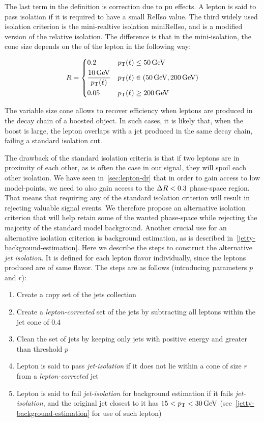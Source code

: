 The last term in the definition is correction due to \gls{pu} effects. A lepton is said to pass isolation if it is required to have a small RelIso value. The third widely used isolation criterion is the mini-realtive isolation miniRelIso, and is a modified version of the relative isolation. The difference is that in the mini-isolation, the cone size depends on the \pt of the lepton in the following way:

\begin{equation}
R = 
\begin{dcases}
0.2 & p_{\mathrm{T}}(\ell)\leq 50\,\text{Ge\hspace{-.08em}V} \\
\frac{10\,\text{Ge\hspace{-.08em}V}}{p_{\mathrm{T}}(\ell)} & p_{\mathrm{T}}(\ell) \in (50\,\text{Ge\hspace{-.08em}V} , 200\,\text{Ge\hspace{-.08em}V}) \\
0.05 & p_{\mathrm{T}}(\ell)\geq 200\,\text{Ge\hspace{-.08em}V}
\end{dcases}
\end{equation}

The variable size cone allows to recover efficiency when leptons are produced in the decay chain of a boosted object. In such cases, it is likely that, when the boost is large, the lepton overlaps with a jet produced in the same decay chain, failing a standard isolation cut. 

The drawback of the standard isolation criteria is that if two leptons are in proximity of each other, as is often the case in our signal, they will spoil each other isolation. We have seen in~\ref{sec:lepton-dr} that in order to gain access to low \dm model-points, we need to also gain access to the $\Delta R<0.3$ phase-space region. That means that requiring any of the standard isolation criterion will result in rejecting valuable signal events. We therefore propose an alternative isolation criterion that will help retain some of the wanted phase-space while rejecting the majority of the standard model background. Another crucial use for an alternative isolation criterion is background estimation, as is described in~\ref{jetty-background-estimation}. Here we describe the steps to construct the alternative \emph{jet isolation}. It is defined for each lepton flavor individually, since the leptons produced are of same flavor. The steps are as follows (introducing parameters $p$ and $r$):

\begin{enumerate}
\item Create a copy set of the jets collection
\item Create a \emph{lepton-corrected} set of the jets by subtracting all leptons within the jet cone of 0.4
\item Clean the set of jets by keeping only jets with positive energy and \pt greater than threshold $p$
\item Lepton is said to pass \emph{jet-isolation} if it does not lie within a cone of size $r$ from a \emph{lepton-corrected} jet
\item Lepton is said to fail \emph{jet-isolation} for background estimation if it fails \emph{jet-isolation}, and the original jet closest to it has $15<p_{\mathrm{T}}<30\,\text{Ge\hspace{-.08em}V}$ (see~\ref{jetty-background-estimation} for use of such lepton)
\end{enumerate}

